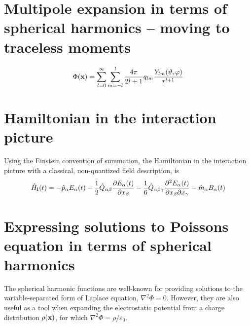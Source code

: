 \section{Multipole expansion in terms of spherical harmonics -- moving to
         traceless moments}
$$
  \Phi({\bf x})=\sum^{\infty}_{l=0}\sum^{l}_{m=-l}
  {{4\pi}\over{2l+1}}q_{lm}{{Y_{lm}(\vartheta,\varphi)}\over{r^{l+1}}}
$$

\section{Hamiltonian in the interaction picture}
Using the Einstein convention of summation, the Hamiltonian in the interaction
picture with a classical, non-quantized field description, is
$$
  \hat{H}_{\rm I}(t) = -\hat{p}_{\alpha}E_{\alpha}(t)
    -{{1}\over{2}}\hat{Q}_{\alpha\beta}
       {{\partial E_{\alpha}(t)}\over{\partial x_{\beta}}}
    -{{1}\over{6}}\hat{Q}_{\alpha\beta\gamma}
       {{\partial^2 E_{\alpha}(t)}\over{\partial x_{\beta}\partial x_{\gamma}}}
    -\hat{m}_{\alpha}B_{\alpha}(t)
$$


\section{Expressing solutions to Poissons equation in terms of spherical
         harmonics}
The spherical harmonic functions are well-known for providing solutions to the
variable-separated form of Laplace equation, $\nabla^2\Phi=0$. However, they
are also useful as a tool when expanding the electrostatic potential from a
charge distribution $\rho({\bf x})$, for which
$\nabla^2\Phi=\rho/\varepsilon_0$.

